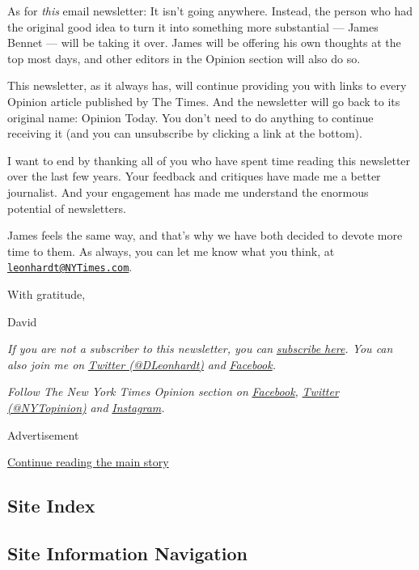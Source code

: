As for \emph{this} email newsletter: It isn't going anywhere. Instead,
the person who had the original good idea to turn it into something more
substantial --- James Bennet --- will be taking it over. James will be
offering his own thoughts at the top most days, and other editors in the
Opinion section will also do so.

This newsletter, as it always has, will continue providing you with
links to every Opinion article published by The Times. And the
newsletter will go back to its original name: Opinion Today. You don't
need to do anything to continue receiving it (and you can unsubscribe by
clicking a link at the bottom).

I want to end by thanking all of you who have spent time reading this
newsletter over the last few years. Your feedback and critiques have
made me a better journalist. And your engagement has made me understand
the enormous potential of newsletters.

James feels the same way, and that's why we have both decided to devote
more time to them. As always, you can let me know what you think, at
\href{mailto:leonhardt@NYTimes.com}{\nolinkurl{leonhardt@NYTimes.com}}.

With gratitude,

David

\emph{If you are not a subscriber to this newsletter, you can}
\href{https://www.nytimes3xbfgragh.onion/newsletters/david-leonhardt}{\emph{subscribe
here}}\emph{. You can also join me on}
\href{https://twitter.com/DLeonhardt}{\emph{Twitter (@DLeonhardt)}}
\emph{and}
\href{https://www.facebookcorewwwi.onion/DavidRLeonhardt/}{\emph{Facebook}}\emph{.}

\emph{Follow The New York Times Opinion section on}
\href{https://www.facebookcorewwwi.onion/nytopinion}{\emph{Facebook}}\emph{,}
\href{http://twitter.com/NYTOpinion}{\emph{Twitter (@NYTopinion)}}
\emph{and}
\href{https://www.instagram.com/nytopinion/}{\emph{Instagram}}\emph{.}

Advertisement

\protect\hyperlink{after-bottom}{Continue reading the main story}

\hypertarget{site-index}{%
\subsection{Site Index}\label{site-index}}

\hypertarget{site-information-navigation}{%
\subsection{Site Information
Navigation}\label{site-information-navigation}}

